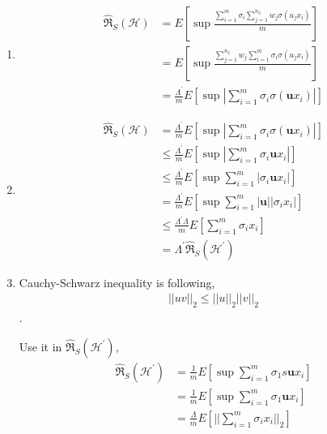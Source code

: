 \documentclass[12pt]{article}
\begin{document}
\begin{enumerate}[label=(\alph*), left=0pt]
    \item 
    \begin{align*}
        \hat{\mathfrak{R}}_{S}(\mathcal{H}) &= E[\sup \frac{\sum \limits_{i=1}^{m} \sigma_{i} \sum \limits_{j=1}^{n_{2}}
            w_{j}\sigma (u_{j} x_{i})}{m}] \\
        &= E[\sup \frac{\sum \limits_{j=1}^{n_{2}} w_{j} \sum \limits_{i=1}^{m} \sigma_{i}
            \sigma(u_{j} x_{i})}{m}] \\
        &= \frac{\Lambda^{'}}{m} E[\sup |\sum \limits_{i=1}^{m} \sigma_{i} \sigma(\mathbf{u} x_{i})|]
    \end{align*}

    \item 
    \begin{align*}
        \hat{\mathfrak{R}}_{S}(\mathcal{H}) &= \frac{\Lambda^{'}}{m} E[\sup |\sum \limits_{i=1}^{m} \sigma_{i} \sigma(\mathbf{u}
            x_{i})|] \\
        &\le \frac{\Lambda^{'}}{m} E[\sup |\sum \limits_{i=1}^{m} \sigma_{i} \mathbf{u}x_{i}|] \\
        &\le \frac{\Lambda^{'}}{m} E[\sup \sum \limits_{i=1}^{m} |\sigma_{i} \mathbf{u}x_{i}|] \\
        &= \frac{\Lambda^{'}}{m} E[\sup \sum \limits_{i=1}^{m} |\mathbf{u}| |\sigma_{i} x_{i}|] \\
        &\le \frac{\Lambda^{'} \Lambda}{m} E[\sum \limits_{i=1}^{m} \sigma_{i} x_{i}] \\
        &= \Lambda^{'} \hat{\mathfrak{R}}_{S}(\mathcal{H^{'}})
    \end{align*}

    \item 
    Cauchy-Schwarz inequality is following,
    \begin{align*}
        ||u v||_{2} \le ||u||_{2} ||v||_{2}
    \end{align*}.

    Use it in $\hat{\mathfrak{R}}_{S}(\mathcal{H^{'}})$, 
    \begin{align*}
        \hat{\mathfrak{R}}_{S}(\mathcal{H^{'}}) &= \frac{1}{m} E[\sup \sum \limits_{i=1}^{m} \sigma_{1} s\mathbf{u}x_{i}] \\
        &= \frac{1}{m} E[\sup \sum \limits_{i=1}^{m} \sigma_{1} \mathbf{u}x_{i}] \\
        &= \frac{\Lambda}{m} E[||\sum \limits_{i=1}^{m} \sigma_{i} x_{i}||_{2}]
    \end{align*}


\end{enumerate}
\end{document}
